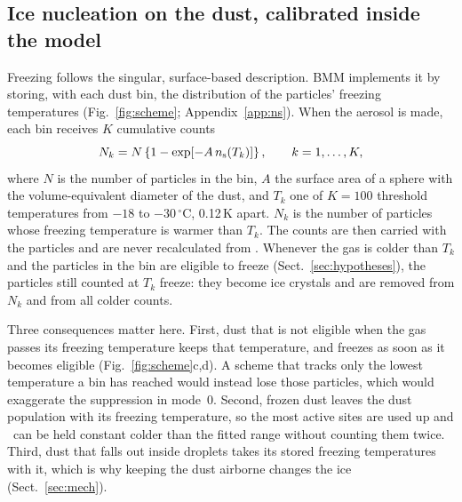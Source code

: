 \subsection{Ice nucleation on the dust, calibrated inside the model}\label{sec:nsfit}

Freezing follows the singular, surface-based description. BMM implements it by storing, with each dust bin, the distribution of the particles' freezing temperatures (Fig.~\ref{fig:scheme}; Appendix~\ref{app:ns}). When the aerosol is made, each bin receives $K$ cumulative counts
\begin{equation}
  N_k = N\left\{1-\exp\!\left[-A\,n_\mathrm{s}(T_k)\right]\right\}, \qquad k = 1,\dots,K,
  \label{eq:inas}
\end{equation}
where $N$ is the number of particles in the bin, $A$ the surface area of a sphere with the volume-equivalent diameter of the dust, and $T_k$ one of $K = 100$ threshold temperatures from $-18$ to $-30\,^\circ$C, 0.12\,K apart. $N_k$ is the number of particles whose freezing temperature is warmer than $T_k$. The counts are then carried with the particles and are never recalculated from \ns. Whenever the gas is colder than $T_k$ and the particles in the bin are eligible to freeze (Sect.~\ref{sec:hypotheses}), the particles still counted at $T_k$ freeze: they become ice crystals and are removed from $N_k$ and from all colder counts.

Three consequences matter here. First, dust that is not eligible when the gas passes its freezing temperature keeps that temperature, and freezes as soon as it becomes eligible (Fig.~\ref{fig:scheme}c,d). A scheme that tracks only the lowest temperature a bin has reached would instead lose those particles, which would exaggerate the suppression in mode~0. Second, frozen dust leaves the dust population with its freezing temperature, so the most active sites are used up and \ns\ can be held constant colder than the fitted range without counting them twice. Third, dust that falls out inside droplets takes its stored freezing temperatures with it, which is why keeping the dust airborne changes the ice (Sect.~\ref{sec:mech}).

